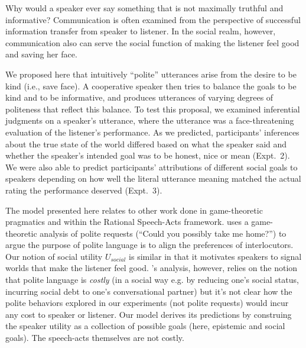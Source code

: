 \documentclass[10pt,letterpaper]{article}
\begin{document}
Why would a speaker ever say something that is not maximally truthful and informative?
Communication is often examined from the perspective of successful information transfer from speaker to listener.
In the social realm, however, communication also can serve the social function of making the listener feel good and saving her face.

We proposed here that intuitively ``polite'' utterances arise from the desire to be kind (i.e., save face). 
A cooperative speaker then tries to balance the goals to be kind and to be informative, and produces utterances of varying degrees of politeness that reflect this balance.
To test this proposal, we examined inferential judgments on a speaker's utterance, where the utterance was a face-threatening evaluation of the listener's performance.
As we predicted, participants' inferences about the true state of the world differed based on what the speaker said and whether the speaker's intended goal was to be honest, nice or mean (Expt.~2).
We were also able to predict participants' attributions of different social goals to speakers depending on
how well the literal utterance meaning matched the actual rating the performance deserved (Expt.~3).

The model presented here relates to other work done in game-theoretic pragmatics and within the Rational Speech-Acts framework.
 uses a game-theoretic analysis of polite requests (``Could you possibly take me home?'') to argue the purpose of polite language is to align the preferences of interlocutors. 
Our notion of social utility $U_{social}$ is similar in that it motivates speakers to signal worlds that make the listener feel good. 
\citeauthor{VanRooy2003}'s analysis, however, relies on the notion that polite language is \emph{costly} (in a social way e.g. by reducing one's social status, incurring social debt to one's conversational partner) but it's not clear how the polite behaviors explored in our experiments (not polite requests) would incur any cost to speaker or listener. 
Our model derives its predictions by construing the speaker utility as a collection of possible goals (here, epistemic and social goals). The speech-acts themselves are not costly. 
\end{document}
